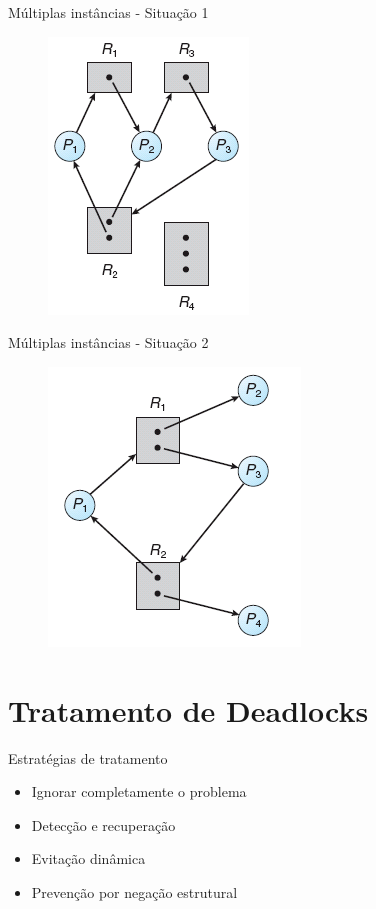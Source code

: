 \documentclass[aspectratio=169,
				xcolor=table]{beamer}
\begin{document}
	\begin{frame}{Múltiplas instâncias - Situação 1}		
		\begin{figure}
			\centering
			\includegraphics[keepaspectratio, height=0.7\paperheight]{../figs/cap07/recursomulti01.png}			
		\end{figure}
	\end{frame}	
	
	\begin{frame}{Múltiplas instâncias - Situação 2}		
		\begin{figure}
			\centering
			\includegraphics[keepaspectratio, height=0.7\paperheight]{../figs/cap07/recursomulti02.png}			
		\end{figure}
	\end{frame}	
	
	\section{Tratamento de Deadlocks}
	\begin{frame}{Estratégias de tratamento}
		\begin{itemize}
			\item Ignorar completamente o problema
			\item Detecção e recuperação
			\item Evitação dinâmica
			\item Prevenção por negação estrutural
		\end{itemize}
	\end{frame}
	
\end{document}
